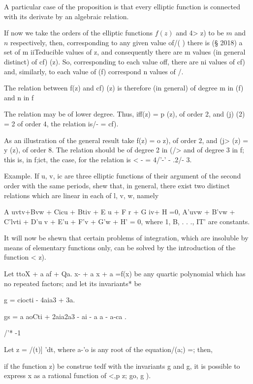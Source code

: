 {A particular case of the proposition is that every elliptic function
is connected with its derivate by an algebraic relation.

If now we take the orders of the elliptic functions $f(z)$ and 4> z) to
be $m$ and $n$ respectively, then, corresponding to any given value of/( )
there is (§ 2018) a set of m iiTeducible values of z, and consequently
there are m values (in general distinct) of cf) (z). So, corresponding
to each value off, there are ni values of cf) and, similarly, to each
value of (f) correspond n values of /.

The relation between f(z) and cf) (z) is therefore (in general) of
degree m in (f) and n in f

The relation may be of lower degree. Thus, iff(z) = p (z), of order 2,
and (j) (2) = 2 of order 4, the relation is/- = cf).

As an illustration of the general result take f(z) = o z), of order 2,
and (j> (z) = y (z), of order 8. The relation should be of degree 2 in
(/> and of degree 3 in f; this is, in f;ict, the case, for the
relation is < - = 4/'-' - .2/- 3.

Example. If u, v, ic are three elliptic functions of their argument of
the second order with the same periods, shew that, in general, there
exist two distinct relations which are linear in each of l, v, w,
namely

A uvtv+Bvw + Cicu + Btiv + E u + F r + G iv+ H =0, A'uvw + B'vw +
C'lvti + D'u v + E'u + F'v + G'w + H' = 0, where 1, B, . . ., IT'
are constants.


It will now be shewn that certain problems of integration, which are
insoluble by means of elementary functions only, can be solved by the
introduction of the function < z).

%
%

Let ttoX + a af + Qa. x- + a x + a =f(x) be any quartic polynomial
which has no repeated factors; and let its invariants* be

g = ciocti - 4aia3 + 3a.

gs = a aoCti + 2aia2a3 - ai - a a - a-ca .

/'* -1

Let z = /(t)] 'dt, where a-'o is any root of the equation/(a;) =;
then,

if the function z) be construe tedf with the invariants g and g, it
is possible to express x as a rational function of <,p z; go, g ).

}

